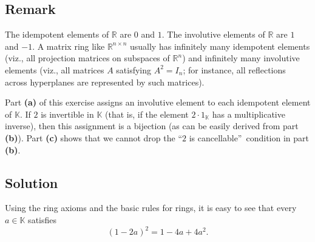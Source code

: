 \documentclass[paper=a4, fontsize=12pt]{scrartcl}%
\theoremstyle{plainsl}
\theoremstyle{definition}
\theoremstyle{remark}
\begin{document}
\subsection{Remark}

The idempotent elements of $\mathbb{R}$ are $0$ and $1$. The involutive
elements of $\mathbb{R}$ are $1$ and $-1$. A matrix ring like $\mathbb{R}%
^{n\times n}$ usually has infinitely many idempotent elements (viz., all
projection matrices on subspaces of $\mathbb{R}^{n}$) and infinitely many
involutive elements (viz., all matrices $A$ satisfying $A^{2}=I_{n}$; for
instance, all reflections across hyperplanes are represented by such matrices).

Part \textbf{(a)} of this exercise assigns an involutive element to each
idempotent element of $\mathbb{K}$. If $2$ is invertible in $\mathbb{K}$ (that
is, if the element $2\cdot1_{\mathbb{K}}$ has a multiplicative inverse), then
this assignment is a bijection (as can be easily derived from part
\textbf{(b)}). Part \textbf{(c)} shows that we cannot drop the
\textquotedblleft$2$ is cancellable\textquotedblright\ condition in part
\textbf{(b)}.

\subsection{Solution}

Using the ring axioms and the basic rules for rings, it is easy to see that
every $a\in\mathbb{K}$ satisfies%
\begin{equation}
\left(  1-2a\right)  ^{2}=1-4a+4a^{2}. \label{sol.ring.idp-inv.1}%
\end{equation}
\end{document}
